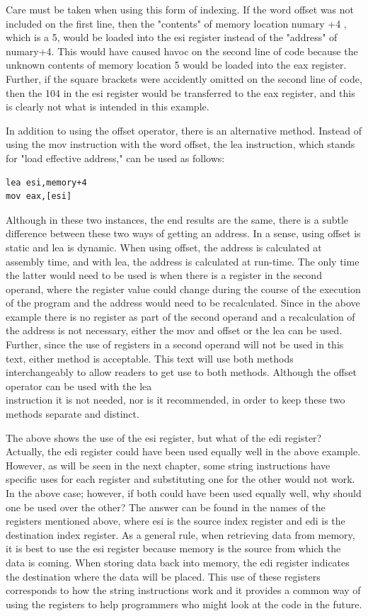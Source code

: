 \documentclass[10pt]{article}
\begin{document}
Care must be taken when using this form of indexing. If the word offset was not included on the first line, then the "contents" of memory location numary +4 , which is a 5, would be loaded into the esi register instead of the "address" of numary+4. This would have caused havoc on the second line of code because the unknown contents of memory location 5 would be loaded into the eax register. Further, if the square brackets were accidently omitted on the second line of code, then the 104 in the esi register would be transferred to the eax register, and this is clearly not what is intended in this example.

In addition to using the offset operator, there is an alternative method. Instead of using the mov instruction with the word offset, the lea instruction, which stands for "load effective address," can be used as follows:

\begin{verbatim}
lea esi,memory+4
mov eax,[esi]
\end{verbatim}

Although in these two instances, the end results are the same, there is a subtle difference between these two ways of getting an address. In a sense, using offset is static and lea is dynamic. When using offset, the address is calculated at assembly time, and with lea, the address is calculated at run-time. The only time the latter would need to be used is when there is a register in the second operand, where the register value could change during the course of the execution of the program and the address would need to be recalculated. Since in the above example there is no register as part of the second operand and a recalculation of the address is not necessary, either the mov and offset or the lea can be used. Further, since the use of registers in a second operand will not be used in this text, either method is acceptable. This text will use both methods interchangeably to allow readers to get use to both methods. Although the offset operator can be used with the lea\\
instruction it is not needed, nor is it recommended, in order to keep these two methods separate and distinct.

The above shows the use of the esi register, but what of the edi register? Actually, the edi register could have been used equally well in the above example. However, as will be seen in the next chapter, some string instructions have specific uses for each register and substituting one for the other would not work. In the above case; however, if both could have been used equally well, why should one be used over the other? The answer can be found in the names of the registers mentioned above, where esi is the source index register and edi is the destination index register. As a general rule, when retrieving data from memory, it is best to use the esi register because memory is the source from which the data is coming. When storing data back into memory, the edi register indicates the destination where the data will be placed. This use of these registers corresponds to how the string instructions work and it provides a common way of using the registers to help programmers who might look at the code in the future.
\end{document}
